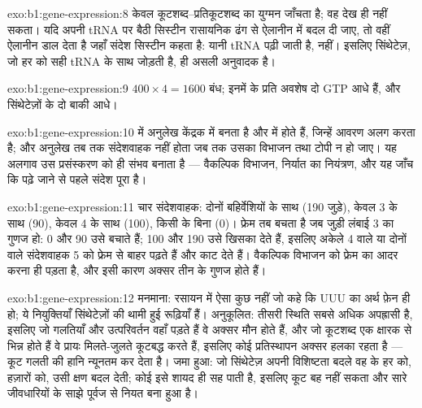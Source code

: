 \begin{solution}{exo:b1:gene-expression:8}
 केवल कूटशब्द--प्रतिकूटशब्द का युग्मन जाँचता है; वह 
देख ही नहीं सकता। यदि अपनी tRNA पर बैठी सिस्टीन रासायनिक ढंग से
ऐलानीन में बदल दी जाए, तो  वहीं ऐलानीन डाल देता है जहाँ संदेश
सिस्टीन कहता है: यानी tRNA पढ़ी जाती है,  नहीं। इसलिए सिंथेटेज़,
जो हर  को सही tRNA के साथ जोड़ती है, ही असली
अनुवादक है।
\end{solution}

\begin{solution}{exo:b1:gene-expression:9}
$400\times 4 = 1600$ बंध; इनमें  के प्रति अवशेष दो GTP आधे हैं,
और सिंथेटेज़ों के दो बाकी आधे।
\end{solution}

\begin{solution}{exo:b1:gene-expression:10}
 में अनुलेख केंद्रक में बनता है और
  में होते हैं, जिन्हें आवरण अलग करता है; और
अनुलेख तब तक संदेशवाहक नहीं होता जब तक उसका विभाजन तथा टोपी न हो जाए।
यह अलगाव उस प्रसंस्करण को ही संभव बनाता है --- वैकल्पिक
विभाजन, निर्यात का नियंत्रण, और यह जाँच कि पढ़े जाने से पहले संदेश
पूरा है।
\end{solution}

\begin{solution}{exo:b1:gene-expression:11}
चार संदेशवाहक: दोनों बहिर्वेशियों के साथ (190  जुड़े), केवल
3 के साथ (90), केवल 4 के साथ (100), किसी के बिना (0)। फ्रेम तब बचता है
जब जुड़ी लंबाई 3 का गुणज हो: 0 और 90 उसे बचाते हैं; 100 और 190 उसे
खिसका देते हैं, इसलिए अकेले  4 वाले या दोनों वाले संदेशवाहक
 5 को फ्रेम से बाहर पढ़ते हैं और  काट देते हैं। वैकल्पिक
विभाजन को फ्रेम का आदर करना ही पड़ता है, और इसी कारण  अक्सर तीन
के गुणज होते हैं।
\end{solution}

\begin{solution}{exo:b1:gene-expression:12}
मनमाना: रसायन में ऐसा कुछ नहीं जो कहे कि UUU का अर्थ फ़ेन ही हो;
ये नियुक्तियाँ सिंथेटेज़ों की थामी हुई रूढ़ियाँ हैं। अनुकूलित: तीसरी
स्थिति सबसे अधिक अपह्रासी है, इसलिए जो गलतियाँ और उत्परिवर्तन वहाँ पड़ते
हैं वे अक्सर मौन होते हैं, और जो कूटशब्द एक क्षारक से भिन्न होते हैं वे
प्रायः मिलते-जुलते  कूटबद्ध करते हैं, इसलिए कोई प्रतिस्थापन
अक्सर हलका रहता है --- कूट गलती की हानि न्यूनतम कर देता है। जमा हुआ: जो
सिंथेटेज़ अपनी विशिष्टता बदले वह  के हर  को, हज़ारों को,
उसी क्षण बदल देती; कोई  इसे शायद ही सह पाती है, इसलिए कूट बह नहीं
सकता और सारे जीवधारियों के साझे पूर्वज से नियत बना हुआ है।
\end{solution}

